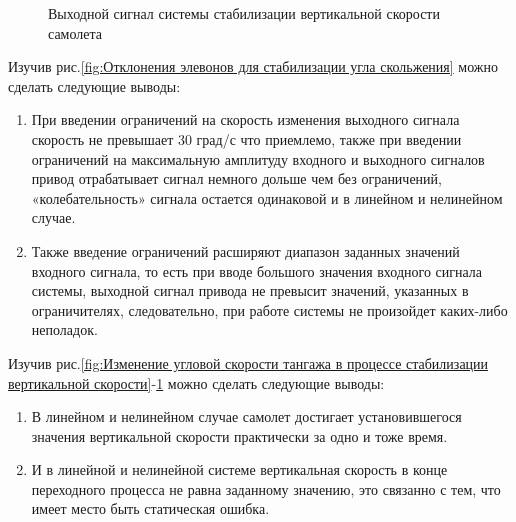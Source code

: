 \begin{figure}[H]
    \caption{Выходной сигнал системы стабилизации вертикальной скорости самолета}
    \label{fig:Входной сигнал системы стабилизации вертикальной скорости}
\end{figure}



\begin{center}
\end{center}

Изучив рис.\ref{fig:Отклонения элевонов для стабилизации угла скольжения} можно сделать следующие выводы:
\begin{enumerate}
    \item При введении ограничений на скорость изменения выходного сигнала скорость не превышает 30 град/с что приемлемо, также при введении ограничений на максимальную амплитуду входного и выходного сигналов привод отрабатывает сигнал немного дольше чем без ограничений, «колебательность» сигнала остается одинаковой и в линейном и нелинейном случае.
    \item Также введение ограничений расширяют диапазон заданных значений входного сигнала, то есть при вводе большого значения входного сигнала системы, выходной сигнал привода не превысит значений, указанных в ограничителях, следовательно, при работе системы не произойдет каких-либо неполадок. 
\end{enumerate}
Изучив рис.\ref{fig:Изменение угловой скорости тангажа в процессе стабилизации вертикальной скорости}-\ref{fig:Входной сигнал системы стабилизации вертикальной скорости} можно сделать следующие выводы:

\begin{enumerate}
    \item В линейном и нелинейном случае самолет достигает установившегося значения вертикальной скорости практически за одно и тоже время. 
    \item И в линейной и нелинейной системе вертикальная скорость в конце переходного процесса не равна заданному значению, это связанно с тем, что имеет место быть статическая ошибка. 
\end{enumerate}